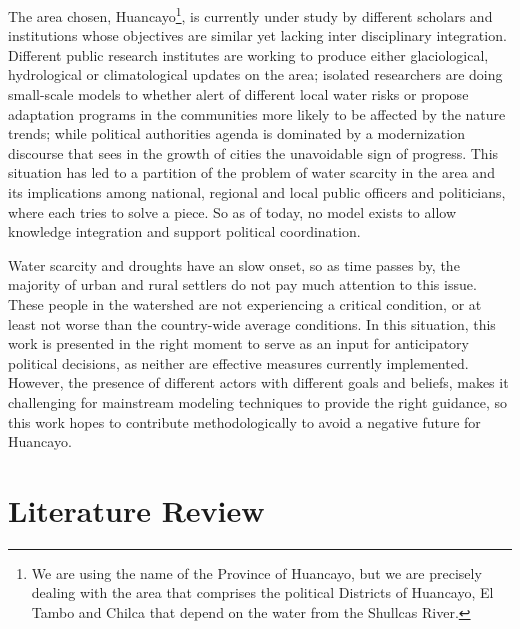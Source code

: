 \documentclass{article}
\begin{document}
The area chosen, Huancayo\footnote{We are using the name of the Province of Huancayo, but we are precisely dealing with the area that comprises the political Districts of Huancayo, El Tambo and Chilca that depend on the water from the Shullcas River.}, is currently under study by different scholars and institutions whose objectives are similar yet lacking inter disciplinary integration. Different public  research institutes are working to produce either glaciological, hydrological or climatological updates on the area; isolated researchers are doing small-scale models to whether alert of different local water risks or propose adaptation programs in the communities more likely to be affected by the nature trends; while political authorities agenda is dominated by a modernization discourse that sees in the growth of cities the unavoidable sign of progress. This situation has led to a partition of the problem of water scarcity in the area and its implications among national, regional and local public officers and politicians, where each tries to solve a piece. So as of today, no model exists to allow  knowledge integration and support political coordination. 

Water scarcity and droughts have an slow onset, so as time passes by, the majority of urban and rural settlers do not pay much attention to this issue. These people in the watershed are not experiencing a critical condition, or at least not worse than the country-wide average conditions. In this situation, this work is presented in the right moment to serve as an input for  anticipatory political decisions, as neither are effective measures currently implemented. However, the presence of different actors with different goals and beliefs, makes it challenging for mainstream modeling techniques to provide the right guidance, so this work hopes to contribute methodologically to avoid a negative future for Huancayo.

\section{Literature Review}
\end{document}
